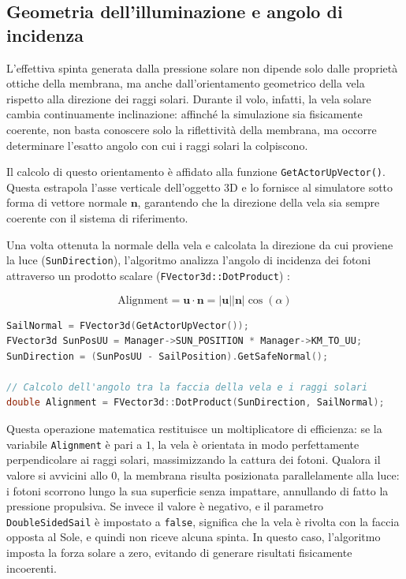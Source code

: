 
\subsection{Geometria dell'illuminazione e angolo di incidenza}

L'effettiva spinta generata dalla pressione solare non dipende solo dalle proprietà ottiche della membrana, ma anche dall'orientamento geometrico della vela rispetto alla direzione dei raggi solari. Durante il volo, infatti, la vela solare cambia continuamente inclinazione: affinché la simulazione sia fisicamente coerente, non basta conoscere solo la riflettività della membrana, ma occorre determinare l'esatto angolo con cui i raggi solari la colpiscono.

Il calcolo di questo orientamento è affidato alla funzione \lstinline|GetActorUpVector()|. Questa estrapola l'asse verticale dell'oggetto 3D e lo fornisce al simulatore sotto forma di vettore normale $\mathbf{n}$, garantendo che la direzione della vela sia sempre coerente con il sistema di riferimento.

Una volta ottenuta la normale della vela e calcolata la direzione da cui proviene la luce (\lstinline|SunDirection|), l'algoritmo analizza l'angolo di incidenza dei fotoni attraverso un prodotto scalare (\lstinline|FVector3d::DotProduct|) \cite{mcinnes1999solar}:

\begin{equation}
\text{Alignment} = \mathbf{u} \cdot \mathbf{n} = |\mathbf{u}| |\mathbf{n}| \cos(\alpha)
\end{equation}

\begin{lstlisting}[language=C++, caption={Estrazione della normale e calcolo dell'angolo di incidenza in \lstinline|SolarSail.cpp|.}]
SailNormal = FVector3d(GetActorUpVector());
FVector3d SunPosUU = Manager->SUN_POSITION * Manager->KM_TO_UU;
SunDirection = (SunPosUU - SailPosition).GetSafeNormal();

// Calcolo dell'angolo tra la faccia della vela e i raggi solari
double Alignment = FVector3d::DotProduct(SunDirection, SailNormal);
\end{lstlisting}

Questa operazione matematica restituisce un moltiplicatore di efficienza: se la variabile \lstinline|Alignment| è pari a $1$, la vela è orientata in modo perfettamente perpendicolare ai raggi solari, massimizzando la cattura dei fotoni. Qualora il valore si avvicini allo $0$, la membrana risulta posizionata parallelamente alla luce: i fotoni scorrono lungo la sua superficie senza impattare, annullando di fatto la pressione propulsiva.
Se invece il valore è negativo, e il parametro \lstinline|DoubleSidedSail| è impostato a \lstinline|false|, significa che la vela è rivolta con la faccia opposta al Sole, e quindi non riceve alcuna spinta. In questo caso, l'algoritmo imposta la forza solare a zero, evitando di generare risultati fisicamente incoerenti.

